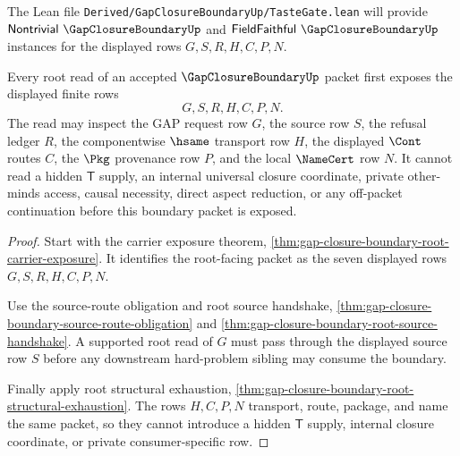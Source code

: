 The Lean file \texttt{Derived/GapClosureBoundaryUp/TasteGate.lean} will provide $\mathsf{Nontrivial}\ \GapClosureBoundaryUp$ and $\mathsf{FieldFaithful}\ \GapClosureBoundaryUp$ instances for the displayed rows $G,S,R,H,C,P,N$.

\begin{theorem}\label{thm:gap-closure-boundary-root-source-exposure}
Every root read of an accepted $\GapClosureBoundaryUp$ packet first exposes the displayed finite rows
$$
G,S,R,H,C,P,N.
$$
The read may inspect the GAP request row $G$, the source row $S$, the refusal ledger $R$, the componentwise $\hsame$ transport row $H$, the displayed $\Cont$ routes $C$, the $\Pkg$ provenance row $P$, and the local $\NameCert$ row $N$. It cannot read a hidden $\mathsf{T}$ supply, an internal universal closure coordinate, private other-minds access, causal necessity, direct aspect reduction, or any off-packet continuation before this boundary packet is exposed.
\end{theorem}
\begin{proof}
Start with the carrier exposure theorem, \autoref{thm:gap-closure-boundary-root-carrier-exposure}. It identifies the root-facing packet as the seven displayed rows $G,S,R,H,C,P,N$.

Use the source-route obligation and root source handshake, \autoref{thm:gap-closure-boundary-source-route-obligation} and \autoref{thm:gap-closure-boundary-root-source-handshake}. A supported root read of $G$ must pass through the displayed source row $S$ before any downstream hard-problem sibling may consume the boundary.

Finally apply root structural exhaustion, \autoref{thm:gap-closure-boundary-root-structural-exhaustion}. The rows $H,C,P,N$ transport, route, package, and name the same packet, so they cannot introduce a hidden $\mathsf{T}$ supply, internal closure coordinate, or private consumer-specific row.
\end{proof}


